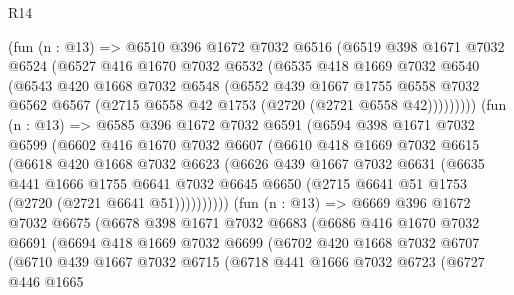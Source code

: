 \begin{lexlean}{R14}
\begin{coremodule}
        (fun (n : @13) =>
        @6510
          @396
          @1672
          @7032
          @6516
          (@6519
            @398
            @1671
            @7032
            @6524
            (@6527
              @416
              @1670
              @7032
              @6532
              (@6535
                @418
                @1669
                @7032
                @6540
                (@6543
                  @420
                  @1668
                  @7032
                  @6548
                  (@6552
                    @439
                    @1667
                    @1755
                    @6558
                    @7032
                    @6562
                    @6567
                    (@2715 @6558 @42 @1753 (@2720 (@2721 @6558 @42)))))))))
        (fun (n : @13) =>
        @6585
          @396
          @1672
          @7032
          @6591
          (@6594
            @398
            @1671
            @7032
            @6599
            (@6602
              @416
              @1670
              @7032
              @6607
              (@6610
                @418
                @1669
                @7032
                @6615
                (@6618
                  @420
                  @1668
                  @7032
                  @6623
                  (@6626
                    @439
                    @1667
                    @7032
                    @6631
                    (@6635
                      @441
                      @1666
                      @1755
                      @6641
                      @7032
                      @6645
                      @6650
                      (@2715 @6641 @51 @1753 (@2720 (@2721 @6641 @51))))))))))
        (fun (n : @13) =>
        @6669
          @396
          @1672
          @7032
          @6675
          (@6678
            @398
            @1671
            @7032
            @6683
            (@6686
              @416
              @1670
              @7032
              @6691
              (@6694
                @418
                @1669
                @7032
                @6699
                (@6702
                  @420
                  @1668
                  @7032
                  @6707
                  (@6710
                    @439
                    @1667
                    @7032
                    @6715
                    (@6718
                      @441
                      @1666
                      @7032
                      @6723
                      (@6727
                        @446
                        @1665

\end{coremodule}
\end{lexlean}
